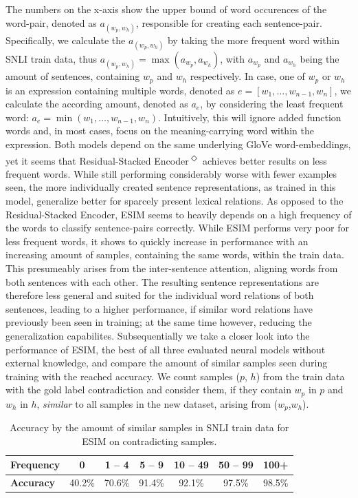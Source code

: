 The numbers on the x-axis show the upper bound of word occurences of the word-pair, denoted as $a_{(w_p,w_h)}$, responsible for creating each sentence-pair. Specifically, we calculate the $a_{(w_p,w_h)}$ by taking the more frequent word within \ac{SNLI} train data, thus $a_{(w_p,w_h)} = \max(a_{w_p},a_{w_h})$, with $a_{w_p}$ and $a_{w_h}$ being the amount of sentences, containing $w_p$ and $w_h$ respectively. In case, one of $w_p$ or $w_h$ is an expression containing multiple words, denoted as $e = [w_1, \ldots , w_{n-1}, w_{n}]$, we calculate the according amount, denoted as $a_e$, by considering the least frequent word: $a_e = \min(w_1, \ldots , w_{n-1}, w_n)$. Intuitively, this will ignore added function words and, in most cases, focus on the meaning-carrying word within the expression. Both models depend on the same underlying GloVe word-embeddings, yet it seems that Residual-Stacked Encoder\textsuperscript{$\Diamond$} achieves better results on less frequent words.  While still performing considerably worse with fewer examples seen, the more individually created sentence representations, as trained in this model, generalize better for sparcely present lexical relations. As opposed to the Residual-Stacked Encoder, ESIM seems to heavily depends on a high frequency of the words to classify sentence-pairs correctly.  While ESIM performs very poor for less frequent words, it shows to quickly increase in performance with an increasing amount of samples, containing the same words, within the train data. This presumeably arises from the inter-sentence attention, aligning words from both sentences with each other. The resulting sentence representations are therefore less general and suited for the individual word relations of both sentences, leading to a higher performance, if similar word relations have previously been seen in training; at the same time however, reducing the generalization capabilites. Subsequentially we take a closer look into the performance of ESIM, the best of all three evaluated neural models without external knowledge, and compare the amount of similar samples seen during training with the reached accuracy. We count samples ($p$, $h$) from the train data with the gold label contradiction and consider them, if they contain $w_p$ in $p$ and $w_h$ in $h$, \textit{similar} to all samples in the new dataset, arising from ($w_p$,$w_h$). 
\begin{table}[tph!]
\centering
\begin{tabular}{l|c|c|c|c|c|c}
\toprule
\textbf{Frequency} & 0 & 1 -- 4 & 5 -- 9 & 10 -- 49 & 50 -- 99 & 100+ \\
\midrule
\textbf{Accuracy} & 40.2\% & 70.6\% & 91.4\% & 92.1\% & 97.5\% & 98.5\% \\
\bottomrule
\end{tabular}
\caption{Accuracy by the amount of similar samples in \ac{SNLI} train data for ESIM on contradicting samples.}
\label{tab:esim_acc_by_sim_samples}
\end{table}
